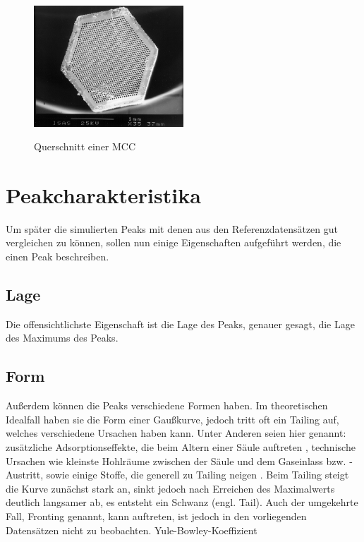 \begin{figure}
 \centering
  \includegraphics[width = 0.5\textwidth]{bilder/MultiCapillaryColumn}\\
  \caption[Querschnitt einer MCC]{Querschnitt einer MCC \protect\footnotemark}
\end{figure}

\section{Peakcharakteristika}
Um später die simulierten Peaks mit denen aus den Referenzdatensätzen gut vergleichen zu können, sollen nun einige Eigenschaften aufgeführt werden, die einen Peak beschreiben.

\subsection{Lage}
Die offensichtlichste Eigenschaft ist die Lage des Peaks, genauer gesagt, die Lage des Maximums des Peaks. 

\subsection{Form}
Außerdem können die Peaks verschiedene Formen haben. Im theoretischen Idealfall haben sie die Form einer Gaußkurve, jedoch tritt oft ein Tailing auf, welches verschiedene Ursachen haben kann. Unter Anderen seien hier genannt: zusätzliche Adsorptionseffekte, die beim Altern einer Säule auftreten \cite{kolb2003}, technische Ursachen wie kleinste Hohlräume zwischen der Säule und dem Gaseinlass bzw. -Austritt, sowie einige Stoffe, die generell zu Tailing neigen . 
Beim Tailing steigt die Kurve zunächst stark an, sinkt jedoch nach Erreichen des Maximalwerts deutlich langsamer ab, es entsteht ein Schwanz (engl. Tail). Auch der umgekehrte Fall, Fronting genannt, kann auftreten, ist jedoch in den vorliegenden Datensätzen nicht zu beobachten.
Yule-Bowley-Koeffizient


